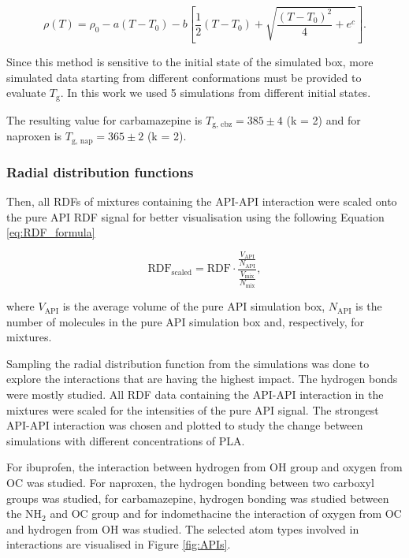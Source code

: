 \begin{equation}\label{eq:fit}
	\rho(T)=\rho_0-a\left(T-T_0\right)-b\left[\frac{1}{2}\left(T-T_0\right)+\sqrt{\frac{\left(T-T_0\right)^2}{4}+e^c}\right].
\end{equation}

Since this method is sensitive to the initial state of the simulated box, more simulated data starting from different conformations must be provided to evaluate $T_\text{g}$. In this work we used 5 simulations from different initial states.

The resulting value for carbamazepine is $T_{\text{g, cbz}} = 385 \pm 4$ (k = 2) and for naproxen is $T_{\text{g, nap}} = 365 \pm 2$ (k = 2). 

\subsubsection{Radial distribution functions}

Then, all RDFs of mixtures containing the API-API interaction were scaled onto the pure API RDF signal for better visualisation using the following Equation \ref{eq:RDF_formula}

\begin{equation}\label{eq:RDF_formula}
	\text{RDF}_{\text{scaled}} = \text{RDF} \cdot \frac{\displaystyle\frac{V_{\text{API}}}{N_{\text{API}}}}{\displaystyle{\frac{V_{\text{mix}}}{N_{\text{mix}}}}},
\end{equation}

where $V_{\text{API}}$ is the average volume of the pure API simulation box, $N_{\text{API}}$ is the number of molecules in the pure API simulation box and, respectively, for mixtures.

Sampling the radial distribution function from the simulations was done to explore the interactions that are having the highest impact. The hydrogen bonds were mostly studied. All RDF data containing the API-API interaction in the mixtures were scaled for the intensities of the pure API signal. The strongest API-API interaction was chosen and plotted to study the change between simulations with different concentrations of PLA. 

For ibuprofen, the interaction between hydrogen from OH group and oxygen from OC was studied. For naproxen, the hydrogen bonding between two carboxyl groups was studied, for carbamazepine, hydrogen bonding was studied between the N$\text{H}_\text{2}$ and OC group and for indomethacine the interaction of oxygen from OC and hydrogen from OH was studied.  The selected atom types involved in interactions are visualised in Figure \ref{fig:APIs}. 

